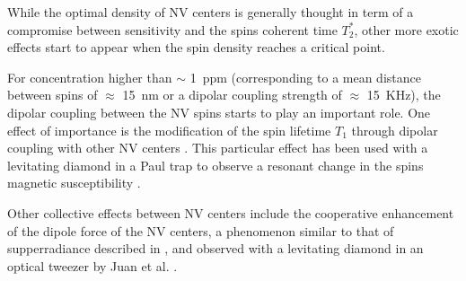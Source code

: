 \documentclass[a4paper]{article}
\begin{document}
	While the optimal density of NV centers is generally thought in term of a compromise between sensitivity and  the spins coherent time $T_2^*$, other more exotic effects start to appear when the spin density reaches a critical point. 
	
	For concentration higher than $\sim$ 1~ppm (corresponding to a mean distance between spins of $\approx$ 15~nm or a dipolar coupling strength of $\approx$ 15~KHz), the dipolar coupling between the NV spins starts to play an important role. One effect of importance is the modification of the spin lifetime $T_1$ through dipolar coupling with other NV centers \cite{Jarmola_temperature_2012,mrozek_longitudinal_2015,choi_depolarization_2017}. This particular effect has been used with a levitating diamond in a Paul trap to observe a resonant change in the spins magnetic susceptibility \cite{pellet2021magnetic}.
	
	Other collective effects between NV centers include the cooperative enhancement of the dipole force of the NV centers, a phenomenon similar to that of supperradiance described in \cite{Bachelard,PANAT,Venkatesh}, and observed with a levitating diamond in an optical tweezer by Juan et al. \cite{Juan}.
    
    
	
    
  
\end{document}
